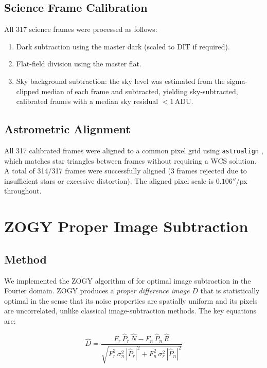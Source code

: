 \documentclass[12pt,a4paper]{article}
\begin{document}
\subsection{Science Frame Calibration}

All 317 science frames were processed as follows:
\begin{enumerate}
  \item Dark subtraction using the master dark (scaled to DIT if required).
  \item Flat-field division using the master flat.
  \item Sky background subtraction: the sky level was estimated from the
        sigma-clipped median of each frame and subtracted, yielding
        sky-subtracted, calibrated frames with a median sky residual $< 1$\,ADU.
\end{enumerate}

\subsection{Astrometric Alignment}

All 317 calibrated frames were aligned to a common pixel grid using
\texttt{astroalign} \citep{Beroiz2020}, which matches star triangles between
frames without requiring a WCS solution. A total of 314/317 frames were
successfully aligned (3 frames rejected due to insufficient stars or excessive
distortion). The aligned pixel scale is $0.106''$/px throughout.

\section{ZOGY Proper Image Subtraction}
\label{sec:zogy}

\subsection{Method}

We implemented the ZOGY algorithm of \citet{Zackay2016} for optimal image
subtraction in the Fourier domain. ZOGY produces a \emph{proper difference
image} $D$ that is statistically optimal in the sense that its noise properties
are spatially uniform and its pixels are uncorrelated, unlike classical
image-subtraction methods. The key equations are:

\begin{equation}
\hat{D} = \frac{F_r\,\hat{P}_r\,\hat{N} - F_n\,\hat{P}_n\,\hat{R}}
               {\sqrt{F_r^2\,\sigma_n^2\,|\hat{P}_r|^2 +
                      F_n^2\,\sigma_r^2\,|\hat{P}_n|^2}}
\label{eq:D}
\end{equation}
\end{document}
